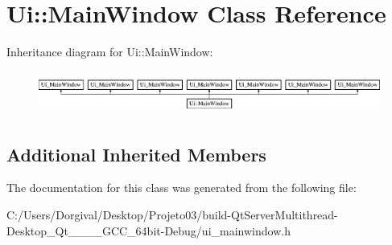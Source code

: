 \section{Ui\+:\+:Main\+Window Class Reference}
\label{class_ui_1_1_main_window}
Inheritance diagram for Ui\+:\+:Main\+Window\+:\begin{figure}[H]
\begin{center}
\leavevmode
\includegraphics[height=1.454545cm]{class_ui_1_1_main_window}
\end{center}
\end{figure}
\subsection*{Additional Inherited Members}


The documentation for this class was generated from the following file\+:\begin{DoxyCompactItemize}
\item 
C\+:/\+Users/\+Dorgival/\+Desktop/\+Projeto03/build-\/\+Qt\+Server\+Multithread-\/\+Desktop\+\_\+\+Qt\+\_\+\_\+\_\+\_\+\+G\+C\+C\+\_\+64bit-\/\+Debug/ui\+\_\+mainwindow.\+h\end{DoxyCompactItemize}
